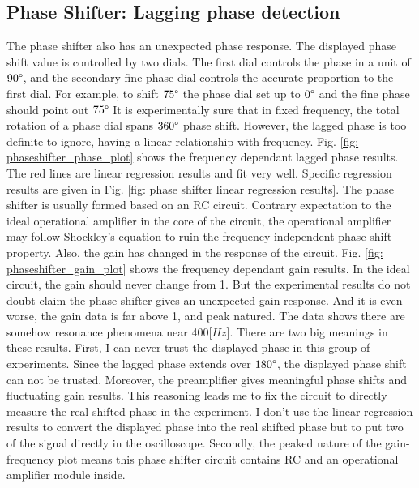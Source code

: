 \documentclass{article}
\begin{document}
\subsection{Phase Shifter: Lagging phase detection}
\label{results: phase shifter}
 The phase shifter also has an unexpected phase response.
 The displayed phase shift value is controlled by two dials.
 The first dial controls the phase in a unit of $90\degree$, and the secondary fine phase dial controls the accurate proportion to the first dial.
 For example, to shift $75\degree$ the phase dial set up to $0\degree$ and the fine phase should point out $75\degree$
 It is experimentally sure that in fixed frequency, the total rotation of a phase dial spans $360\degree$ phase shift.
 However, the lagged phase is too definite to ignore, having a linear relationship with frequency.
 Fig. \ref{fig: phaseshifter_phase_plot} shows the frequency dependant lagged phase results.
 The red lines are linear regression results and fit very well.
 Specific regression results are given in Fig. \ref{fig: phase shifter linear regression results}.
 The phase shifter is usually formed based on an RC circuit.
 Contrary expectation to the ideal operational amplifier in the core of the circuit, the operational amplifier may follow Shockley's equation to ruin the frequency-independent phase shift property.
 Also, the gain has changed in the response of the circuit.
 Fig. \ref{fig: phaseshifter_gain_plot} shows the frequency dependant gain results.
 In the ideal circuit, the gain should never change from 1.
 But the experimental results do not doubt claim the phase shifter gives an unexpected gain response.
 And it is even worse, the gain data is far above 1, and peak natured.
 The data shows there are somehow resonance phenomena near 400[$Hz$].
 There are two big meanings in these results.
 First, I can never trust the displayed phase in this group of experiments.
 Since the lagged phase extends over $180\degree$, the displayed phase shift can not be trusted.
 Moreover, the preamplifier gives meaningful phase shifts and fluctuating gain results.
 This reasoning leads me to fix the circuit to directly measure the real shifted phase in the experiment.
 I don't use the linear regression results to convert the displayed phase into the real shifted phase but to put two of the signal directly in the oscilloscope.
 Secondly, the peaked nature of the gain-frequency plot means this phase shifter circuit contains RC and an operational amplifier module inside.
\end{document}
